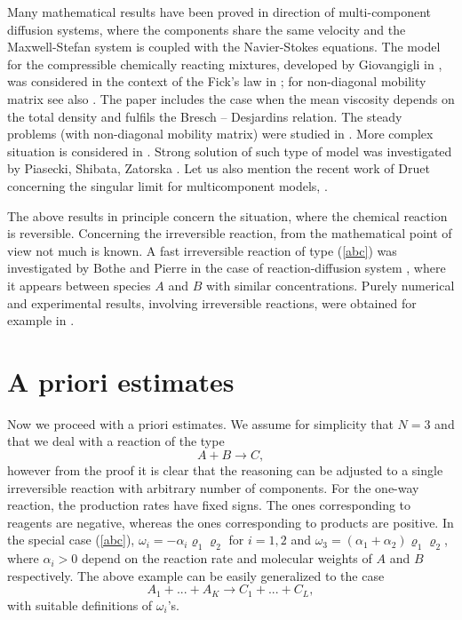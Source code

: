 \documentclass[11pt]{article}
\numberwithin{equation}{section}
\numberwithin{tw}{section}
\begin{document}
Many mathematical results have been proved in direction of multi-component diffusion systems, where the components share the same velocity and the Maxwell-Stefan system is coupled with the Navier-Stokes equations.
The model for the compressible chemically reacting mixtures,  developed by Giovangigli in \cite{Gi}, was considered in the context of the Fick's law in \cite{FPT}; for non-diagonal mobility matrix see also \cite{Za_1}. 
    The paper \cite{MPZ_SIMA} includes the case when the mean viscosity depends on the total density and fulfils the Bresch -- Desjardins relation.   The steady problems (with non-diagonal mobility matrix) were studied in \cite{Zatorska_2011,GPZ,PiPo1}. More complex situation is considered in \cite{DDGG}. Strong solution of such type of model was investigated by Piasecki, Shibata, Zatorska \cite{PSZ1,PSZ2}.
Let us also mention  the recent work of Druet concerning the singular limit for multicomponent models, \cite{D}.



The above results in principle concern the situation, where the chemical reaction is reversible. Concerning the irreversible reaction, from the mathematical point of view not much is known. A fast irreversible reaction of type (\ref{abc}) was investigated by Bothe and Pierre in the case of reaction-diffusion system \cite{BP}, where it appears between species $A$ and $B$ with similar concentrations. Purely numerical and experimental results, involving irreversible reactions, were obtained for example in \cite{bothe-kroeger-warnecke,bubbles1,bubbles2}. 

\section{A priori estimates}\label{a_priori_sect}

Now we proceed with a priori estimates. 
We assume for simplicity that $N=3$ and that we deal with a reaction of the type
 \begin{equation}\label{abc} A + B \rightarrow C, \end{equation}
 however from the proof it is clear that the reasoning can be adjusted to a single irreversible reaction with arbitrary number of components. For the one-way reaction, the production rates have fixed signs. The ones corresponding to reagents are negative, whereas the ones corresponding to products are positive. In the special case (\ref{abc}), $\omega_i = -\alpha_i\varrho_1\varrho_2$ for $i=1,2$ and $\omega_3 = (\alpha_1+\alpha_2)\varrho_1\varrho_2$, where $\alpha_i>0$ depend on the reaction rate and molecular weights of $A$ and $B$ respectively. The above example can be easily generalized to the case
 \[ A_1 + ...+ A_K \rightarrow C_1+ ... + C_L, \]
 with suitable definitions of $\omega_i$'s.
\end{document}
